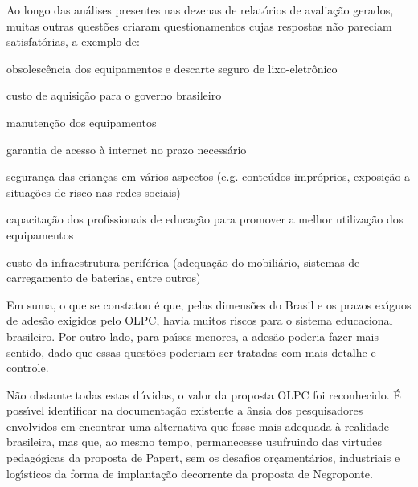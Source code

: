 \documentclass[
12pt,		%
openright,	%
twoside,  %
a4paper,			%
chapter=TITLE,		%
english,			%
french,				%
spanish,			%
brazil				%
]{USPSC-classe/USPSC}
\begin{document}
Ao longo das an\'alises presentes nas dezenas de relat\'orios de avalia\c{c}\~ao gerados, muitas outras quest\~oes criaram questionamentos cujas respostas n\~ao pareciam satisfat\'orias, a exemplo de:


















\begin{alineas}
\item obsolesc\^encia dos equipamentos e descarte seguro de lixo-eletr\^onico
\item custo de aquisi\c{c}\~ao para o governo brasileiro
\item manuten\c{c}\~ao dos equipamentos
\item garantia de acesso \`a internet no prazo necess\'ario
\item seguran\c{c}a das crian\c{c}as em v\'arios aspectos (e.g. conte\'udos impr\'oprios, exposi\c{c}\~ao a situa\c{c}\~oes de risco nas redes sociais)
\item capacita\c{c}\~ao dos profissionais de educa\c{c}\~ao para promover a melhor utiliza\c{c}\~ao dos equipamentos
\item custo da infraestrutura perif\'erica (adequa\c{c}\~ao do mobili\'ario, sistemas de carregamento de baterias, entre outros)
\end{alineas}

Em suma, o que se constatou \'e que, pelas dimens\~oes do Brasil e os prazos ex\'{\i}guos de ades\~ao exigidos pelo OLPC, havia muitos riscos para o sistema educacional brasileiro. Por outro lado, para pa\'{\i}ses menores, a ades\~ao poderia fazer mais sentido, dado que essas quest\~oes poderiam ser tratadas com mais detalhe e controle.

















N\~ao obstante todas estas d\'uvidas, o valor da proposta OLPC foi reconhecido. \'E poss\'{\i}vel identificar na documenta\c{c}\~ao existente a \^ansia dos pesquisadores envolvidos em encontrar uma alternativa que fosse mais adequada \`a realidade brasileira, mas que, ao mesmo tempo, permanecesse usufruindo das virtudes pedag\'ogicas da proposta de Papert, sem os desafios or\c{c}ament\'arios, industriais e log\'{\i}sticos da forma de implanta\c{c}\~ao decorrente da proposta de Negroponte.
\end{document}
